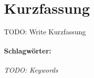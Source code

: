 \section*{Kurzfassung}
\vspace{0.5cm}

TODO: Write Kurzfassung

\paragraph{Schlagwörter:}
\textit{TODO: Keywords}